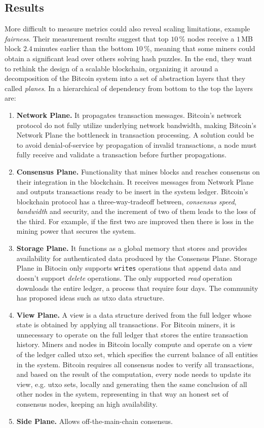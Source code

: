 \documentclass[USenglish]{uit-thesis}
\begin{document}
\subsection{Results}
More difficult to measure metrics could also reveal scaling
limitations, example \emph{fairness}. Their measurement results
suggest that top $10$\,\% nodes receive a $1$\,MB block $2.4$\,minutes
earlier than the bottom $10$\,\%, meaning that some miners could
obtain a significant lead over others solving hash puzzles. In the end,
they want to rethink the design of a scalable blockchain, organizing
it around a decomposition of the Bitcoin system into a set of abstraction
layers that they called \emph{planes}. In a hierarchical of
dependency from bottom to the top the layers are:
\begin{enumerate}[noitemsep]
	\item \textbf{Network Plane.} It propagates transaction messages. Bitcoin's
	network protocol do not fully utilize underlying network bandwidth,
	making Bitcoin's Network Plane the bottleneck in transaction processing.
	A solution could be to avoid denial-of-service by propagation
	of invalid transactions, a node must fully receive and validate a transaction
	before further propagations.
	\item \textbf{Consensus Plane.} Functionality that mines
	blocks and reaches consensus on their integration
	in the blockchain. It receives
	messages from Network Plane and outputs transactions ready to be insert
	in the system ledger. Bitcoin's blockchain protocol has a three-way-tradeoff
	between, \emph{consensus speed}, \emph{bandwidth} and security, and
	the increment of two of them leads to the loss of the third. For example,
	if the first two are improved then there is loss in the mining power
	that secures the system.
	\item \textbf{Storage Plane.} It functions as a global memory
	that stores and provides availability for authenticated data produced
	by the Consensus Plane. Storage Plane in Bitocin only supports
	\texttt{writes} operations that append data and doesn't support
	\emph{delete} operations. The only supported \emph{read} operation
	downloads the entire ledger, a process that require four days. The
	community has proposed ideas such as \gls{utxo} data structure.
	\item \textbf{View Plane.} A view is a data structure derived from the
	full ledger whose state is obtained by applying all transactions. For
	Bitcoin miners, it is unnecessary to operate on the full ledger that
	stores the entire transaction history. Miners and nodes in Bitcoin
	locally compute and operate on a view of the ledger called \gls{utxo} set,
	which specifies the current balance of all entities in the system.
	Bitcoin requires all consensus nodes to verify all transactions, and
	based on the result of the computation, every node needs to update its
	view, e.g. \gls{utxo} sets, locally and generating then the same conclusion
	of all other nodes in the system, representing in that way
	an honest set of consensus nodes, keeping an high availability.
	\item \textbf{Side Plane.} Allows off-the-main-chain consensus.
	
\end{enumerate}
\end{document}
